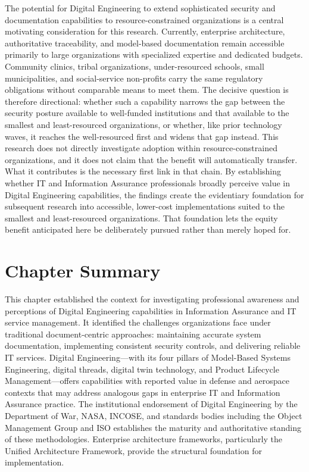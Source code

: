The potential for Digital Engineering to extend sophisticated security and documentation capabilities to resource-constrained organizations is a central motivating consideration for this research. Currently, enterprise architecture, authoritative traceability, and model-based documentation remain accessible primarily to large organizations with specialized expertise and dedicated budgets. Community clinics, tribal organizations, under-resourced schools, small municipalities, and social-service non-profits carry the same regulatory obligations without comparable means to meet them. The decisive question is therefore directional: whether such a capability narrows the gap between the security posture available to well-funded institutions and that available to the smallest and least-resourced organizations, or whether, like prior technology waves, it reaches the well-resourced first and widens that gap instead. This research does not directly investigate adoption within resource-constrained organizations, and it does not claim that the benefit will automatically transfer. What it contributes is the necessary first link in that chain. By establishing whether IT and Information Assurance professionals broadly perceive value in Digital Engineering capabilities, the findings create the evidentiary foundation for subsequent research into accessible, lower-cost implementations suited to the smallest and least-resourced organizations. That foundation lets the equity benefit anticipated here be deliberately pursued rather than merely hoped for.

\section{Chapter Summary}

This chapter established the context for investigating professional awareness and perceptions of Digital Engineering capabilities in Information Assurance and IT service management. It identified the challenges organizations face under traditional document-centric approaches: maintaining accurate system documentation, implementing consistent security controls, and delivering reliable IT services. Digital Engineering---with its four pillars of Model-Based Systems Engineering, digital threads, digital twin technology, and Product Lifecycle Management---offers capabilities with reported value in defense and aerospace contexts that may address analogous gaps in enterprise IT and Information Assurance practice. The institutional endorsement of Digital Engineering by the Department of War, NASA, INCOSE, and standards bodies including the Object Management Group and ISO establishes the maturity and authoritative standing of these methodologies. Enterprise architecture frameworks, particularly the Unified Architecture Framework, provide the structural foundation for implementation.

